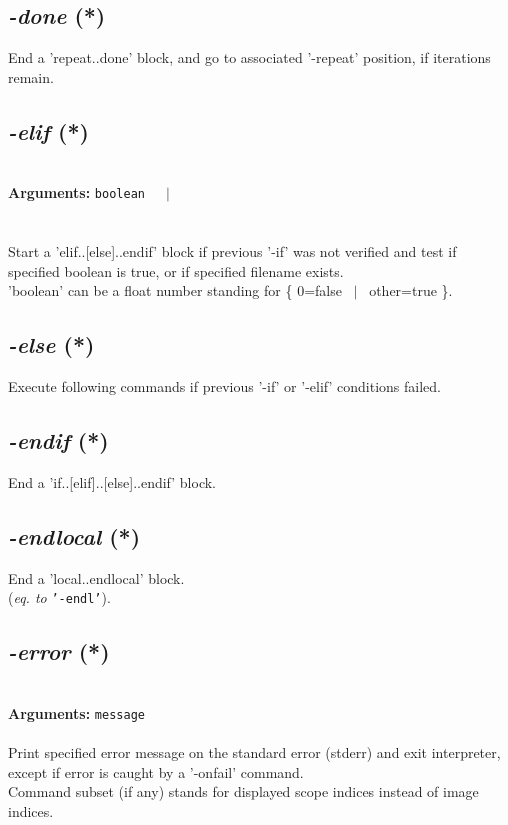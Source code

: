 \documentclass[a4paper,11pt,twoside]{book}
\begin{document}
\subsection{\emph{-done} (*)}\vspace*{-0.5em}
End a 'repeat..done' block, and go to associated '-repeat' position, if iterations remain.


\subsection{\emph{-elif} (*)}\vspace*{-0.5em}
~\\\textbf{Arguments: } 
{\small \texttt{boolean}}~~~$|$\\
\\~\\
Start a 'elif..[else]..endif' block if previous '-if' was not verified
and test if specified boolean is true, or if specified filename exists.
~\\'boolean' can be a float number standing for \{ 0=false ~$|$~ other=true \}.


\subsection{\emph{-else} (*)}\vspace*{-0.5em}
Execute following commands if previous '-if' or '-elif' conditions failed.


\subsection{\emph{-endif} (*)}\vspace*{-0.5em}
End a 'if..[elif]..[else]..endif' block.


\subsection{\emph{-endlocal} (*)}\vspace*{-0.5em}
End a 'local..endlocal' block.
~\\(\emph{eq. to} {\small \texttt{'-endl'}}).


\subsection{\emph{-error} (*)}\vspace*{-0.5em}
~\\\textbf{Arguments: } 
{\small \texttt{message}}\\~\\
Print specified error message on the standard error (stderr) and exit interpreter, except
if error is caught by a '-onfail' command.
~\\Command subset (if any) stands for displayed scope indices instead of image indices.
\end{document}
